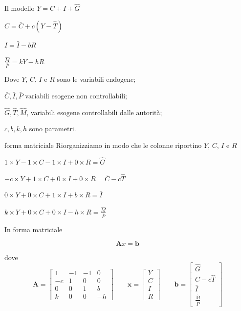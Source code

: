 \begin{frame}{Il modello}
\label{il-modello}
\(Y=C+I+\hat{G}\)

\(C=\bar{C}+c(Y-\hat{T})\)

\(I=\bar{I}-bR\)

\(\frac{\hat{M}}{\bar{P}}=kY-hR\)

\vskip10mm

Dove \(Y\), \(C\), \(I\) e \(R\) sono le variabili endogene;

\(\bar{C}, \bar{I}, \bar{P}\) variabili esogene non controllabili;

\(\hat{G}, \hat{T}, \hat{M}\), variabili esogene controllabili dalle
autorità;

\(c, b, k, h\) sono parametri.
\end{frame}

\begin{frame}{forma matriciale}
\label{forma-matriciale}
Riorganizziamo in modo che le colonne riportino \(Y\), \(C\), \(I\) e
\(R\)

\(1\times Y-1\times C-1\times I+0\times R=\hat{G}\)

\hskip-2.5mm\(-c\times Y+1\times C+0\times I+0\times R=\bar{C}-c\hat{T}\)

\(0\times Y+0\times C+1\times I+b\times R=\bar{I}\)

\(k\times Y+0\times C+0\times I-h\times R=\frac{\hat{M}}{\bar{P}}\)

In forma matriciale

\[\mathbf{A}x=\mathbf{b}\]

dove \[
\mathbf{A}=\left[
\begin{array}{cccc}
1&-1&-1&0\\
-c&1&0&0\\
0&0&1&b\\
k&0&0&-h
\end{array}
\right]
\qquad 
\mathbf{x}=\left[
\begin{array}{c}
Y\\
C\\
I\\
R
\end{array}
\right]
\qquad 
\mathbf{b}=\left[
\begin{array}{c}
\hat{G}\\
\bar{C}-c\hat{T}\\
\bar{I}\\
\frac{\hat{M}}{\bar{P}}
\end{array}
\right]
\]
\end{frame}

